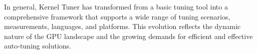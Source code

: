 



In general, Kernel Tuner has transformed from a basic tuning tool into a comprehensive framework that supports a wide range of tuning scenarios, measurements, languages, and platforms. This evolution reflects the dynamic nature of the GPU landscape and the growing demands for efficient and effective auto-tuning solutions. 
